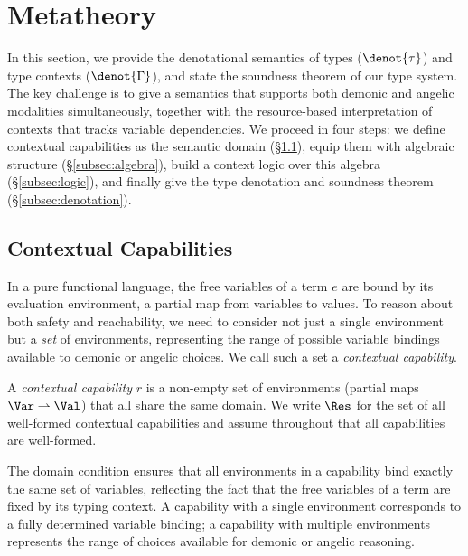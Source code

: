 \section{Metatheory}\label{sec:meta}

In this section, we provide the denotational semantics of types
($\denot{\tau}$) and type contexts ($\denot{\Gamma}$), and state the
soundness theorem of our type system.  The key challenge is to give a
semantics that supports both demonic and angelic modalities
simultaneously, together with the resource-based interpretation of
contexts that tracks variable dependencies.  We proceed in four
steps: we define contextual capabilities as the semantic domain
(\S\ref{subsec:capabilities}), equip them with algebraic structure
(\S\ref{subsec:algebra}), build a context logic over this algebra
(\S\ref{subsec:logic}), and finally give the type denotation and
soundness theorem (\S\ref{subsec:denotation}).

\subsection{Contextual Capabilities}\label{subsec:capabilities}

In a pure functional language, the free variables of a term $e$ are
bound by its evaluation environment, a partial map from variables to
values.  To reason about both safety and reachability, we need to
consider not just a single environment but a \emph{set} of
environments, representing the range of possible variable bindings
available to demonic or angelic choices.  We call such a set a
\emph{contextual capability}.

\begin{definition}\label{def:contextual-capability}
  A \emph{contextual capability} $r$ is a non-empty set of
  environments (partial maps $\Var \rightharpoonup \Val$) that all
  share the same domain.  We write $\Res$ for the set of all
  well-formed contextual capabilities and assume throughout that all
  capabilities are well-formed.
\end{definition}

The domain condition ensures that all environments in a capability
bind exactly the same set of variables, reflecting the fact that the
free variables of a term are fixed by its typing context.  A
capability with a single environment corresponds to a fully determined
variable binding; a capability with multiple environments represents
the range of choices available for demonic or angelic reasoning.

